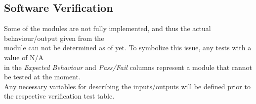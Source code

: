 \documentclass [10pt]{article}
\begin{document}

    
     
    
    
    
     


\subsection {Software Verification}  

Some of the modules are not fully implemented, and thus the actual behaviour/output given from the \\
module can not be determined as of yet. To symbolize this issue, any tests with a value of N/A \\
in the \textit{Expected Behaviour} and \textit{Pass/Fail} columns represent a module that cannot be tested at the moment. \\
Any necessary variables for describing the inputs/outputs will be defined prior to the respective verification test table. \\
\end{document}
